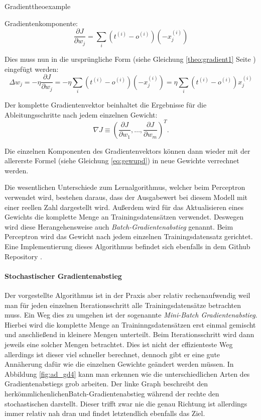 \begin{mytheo}{Gradient}{theoexample}

Gradientenkomponente: 
\begin{equation}
\frac{\partial J}{\partial w_j} = \sum_i  (t^{(i)} - o^{(i)})(-x^{(i)}_{j})
\end{equation}

Dies muss nun in die ursprüngliche Form (siehe Gleichung \ref{theo:gradient1} Seite \pageref{theo:gradient1}) eingefügt werden: 
\begin{equation}
\Delta w_j = - \eta \frac{\partial J}{\partial w_j} = - \eta \sum_i  (t^{(i)} - o^{(i)})(- x^{(i)}_{j}) = \eta \sum_i (t^{(i)} - o^{(i)})x^{(i)}_{j}
\end{equation}

Der komplette Gradientenvektor beinhaltet die Ergebnisse für die Ableitungsschritte nach jedem einzelnen Gewicht:
\begin{equation}
  \nabla J \equiv \left(\frac{\partial J}{\partial w_1}, \ldots, 
  \frac{\partial J}{\partial w_m}\right)^T.
\end{equation}

\end{mytheo}

Die einzelnen Komponenten des Gradientenvektors können dann wieder mit der allererste Formel (siehe Gleichung  \ref{eq:gewupd}) in neue Gewichte verrechnet werden. 

Die wesentlichen Unterschiede zum Lernalgorithmus, welcher beim Perceptron verwendet wird, bestehen daraus, dass der Ausgabewert bei diesem Modell mit einer reellen Zahl dargestellt wird. Außerdem wird für das Aktualisieren eines Gewichts die komplette Menge an Trainingsdatensätzen verwendet. Deswegen wird diese Herangehensweise auch \emph{Batch-Gradientenabstieg} genannt. Beim Perceptron wird das Gewicht nach jedem einzelnen Trainingsdatensatz gerichtet. Eine Implementierung dieses Algorithmus befindet sich ebenfalls in dem Github Repository \cite{pcImplementierung}. 

\paragraph{Stochastischer Gradientenabstieg} \label{par:stochGA}
Der vorgestellte Algorithmus ist in der Praxis aber relativ rechenaufwendig weil man für jeden einzelnen Iterationsschritt alle Trainingsdatensätze betrachten muss. Ein Weg dies zu umgehen ist der sogenannte \emph{Mini-Batch Gradientenabstieg}. Hierbei wird die komplette Menge an Traininngsdatensätzen erst einmal gemischt und anschließend in kleinere Mengen unterteilt. Beim Iterationsschritt wird dann jeweils eine solcher Mengen betrachtet. Dies ist nicht der effizienteste Weg allerdings ist dieser viel schneller berechnet, dennoch gibt er eine gute Annäherung dafür wie die einzelnen Gewichte geändert werden müssen. In Abbildung \ref{fig:ad_gd4} kann man erkennen wie die unterschiedlichen Arten des Gradientenabstiegs grob arbeiten. Der linke Graph beschreibt den \glqq herkömmlichenlichen\grqq  Batch-Gradientenabstieg während der rechte den stochastischen darstellt. Dieser trifft zwar nie die genau Richtung ist allerdings immer relativ nah dran und findet letztendlich ebenfalls das Ziel. 

